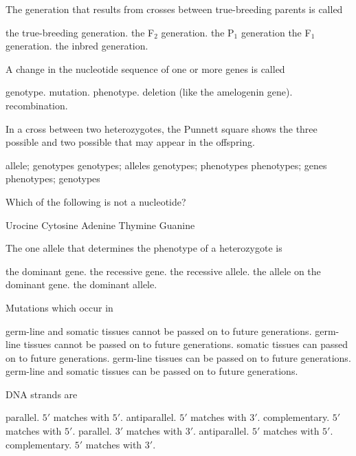 \question
The generation that results from crosses between true-breeding parents is called

\begin{choices}
\choice the true-breeding generation.
\choice the F$_2$ generation.
\choice the P$_1$ generation
\correctchoice the F$_1$ generation.
\choice the inbred generation.
\end{choices}

\question
A change in the nucleotide sequence of one or more genes is called

\begin{choices}
\choice genotype.
\correctchoice mutation.
\choice phenotype.
\choice deletion (like the amelogenin gene).
\choice recombination.
\end{choices}

\question
In a cross between two heterozygotes, the Punnett square shows the three possible \underline{\hspace{2cm}} and two possible \underline{\hspace{2cm}} that may appear in the offspring.

\begin{choices}
\choice allele; genotypes
\correctchoice genotypes; alleles
\choice genotypes; phenotypes
\choice phenotypes; genes
\choice phenotypes; genotypes
\end{choices}

\newpage

\question
Which of the following is not a nucleotide?

\begin{choices}
\correctchoice Urocine
\choice Cytosine
\choice Adenine
\choice Thymine
\choice Guanine
\end{choices}

\question
The one allele that determines the phenotype of a heterozygote is

\begin{choices}
\choice the dominant gene.
\choice the recessive gene.
\choice the recessive allele.
\choice the allele on the dominant gene.
\correctchoice the dominant allele.
\end{choices}

\question
Mutations which occur in 

\begin{choices}
\choice germ-line and somatic tissues cannot be passed on to future generations.
\choice germ-line tissues cannot be passed on to future generations.
\choice somatic tissues can passed on to future generations.
\correctchoice germ-line tissues can be passed on to future generations.
\choice germ-line  and somatic tissues can be passed on to future generations.
\end{choices}

\question
DNA strands are

\begin{choices}
\choice parallel. $5'$ matches with $5'$.
\correctchoice antiparallel. $5'$ matches with $3'$.
\choice complementary. $5'$ matches with $5'$.
\choice parallel. $3'$ matches with $3'$.
\choice antiparallel. $5'$ matches with $5'$.
\choice complementary. $5'$ matches with $3'$.
\end{choices}
